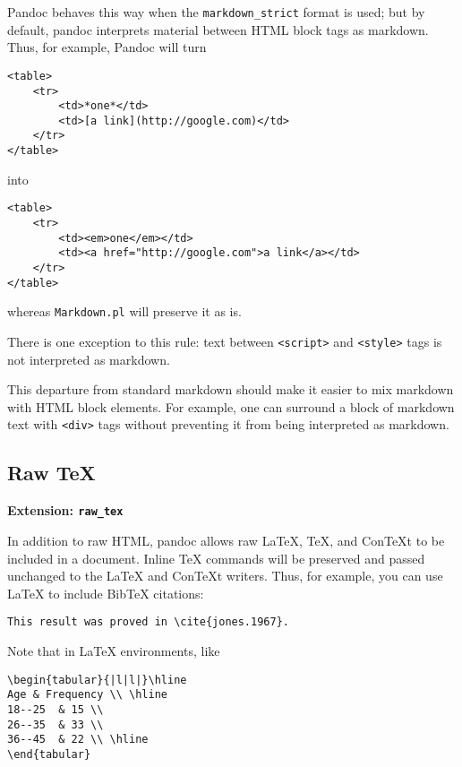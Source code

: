 \documentclass[]{article}
\begin{document}
Pandoc behaves this way when the \texttt{markdown\_strict} format is
used; but by default, pandoc interprets material between HTML block tags
as markdown. Thus, for example, Pandoc will turn

\begin{verbatim}
<table>
    <tr>
        <td>*one*</td>
        <td>[a link](http://google.com)</td>
    </tr>
</table>
\end{verbatim}

into

\begin{verbatim}
<table>
    <tr>
        <td><em>one</em></td>
        <td><a href="http://google.com">a link</a></td>
    </tr>
</table>
\end{verbatim}

whereas \texttt{Markdown.pl} will preserve it as is.

There is one exception to this rule: text between
\texttt{\textless{}script\textgreater{}} and
\texttt{\textless{}style\textgreater{}} tags is not interpreted as
markdown.

This departure from standard markdown should make it easier to mix
markdown with HTML block elements. For example, one can surround a block
of markdown text with \texttt{\textless{}div\textgreater{}} tags without
preventing it from being interpreted as markdown.

\subsection{Raw TeX}\label{raw-tex}

\textbf{Extension: \texttt{raw\_tex}}

In addition to raw HTML, pandoc allows raw LaTeX, TeX, and ConTeXt to be
included in a document. Inline TeX commands will be preserved and passed
unchanged to the LaTeX and ConTeXt writers. Thus, for example, you can
use LaTeX to include BibTeX citations:

\begin{verbatim}
This result was proved in \cite{jones.1967}.
\end{verbatim}

Note that in LaTeX environments, like

\begin{verbatim}
\begin{tabular}{|l|l|}\hline
Age & Frequency \\ \hline
18--25  & 15 \\
26--35  & 33 \\
36--45  & 22 \\ \hline
\end{tabular}
\end{verbatim}
\end{document}
